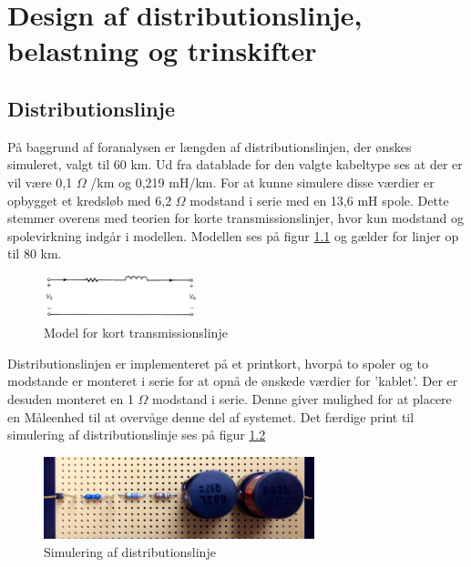
\chapter{Design af distributionslinje, belastning og trinskifter}

\section{Distributionslinje}
På baggrund af foranalysen er længden af distributionslinjen, der ønskes simuleret, valgt til 60 km. Ud fra datablade for den valgte kabeltype ses at der er vil være 0,1 $\Omega$ /km og 0,219 mH/km. For at kunne simulere disse værdier er opbygget et kredsløb med 6,2 $\Omega$ modstand i serie med en 13,6 mH spole. Dette stemmer overens med teorien for korte transmissionslinjer, hvor kun modstand og spolevirkning indgår i modellen. Modellen ses på figur \ref{fig:Kortlinjemodel} og gælder for linjer op til 80 km. 

\begin{figure}[htbp] %
	\centering
	\includegraphics[width=0.4\textwidth]{Figure/Kortlinjemodel2}
	\caption{Model for kort transmissionslinje}
	\label{fig:Kortlinjemodel}
\end{figure}


Distributionslinjen er implementeret på et printkort, hvorpå to spoler og to modstande er monteret i serie for at opnå de ønskede værdier for 'kablet'. Der er desuden monteret en 1 $\Omega$ modstand i serie. Denne giver mulighed for at placere en Måleenhed til at overvåge denne del af systemet. Det færdige print til simulering af distributionslinje ses på figur \ref{fig:Disblinje}

\begin{figure}[H] 
	\centering
	\includegraphics[width=0.7\textwidth]{Figure/Distributionslinje}
	\caption{Simulering af distributionslinje}
	\label{fig:Disblinje}
\end{figure}
